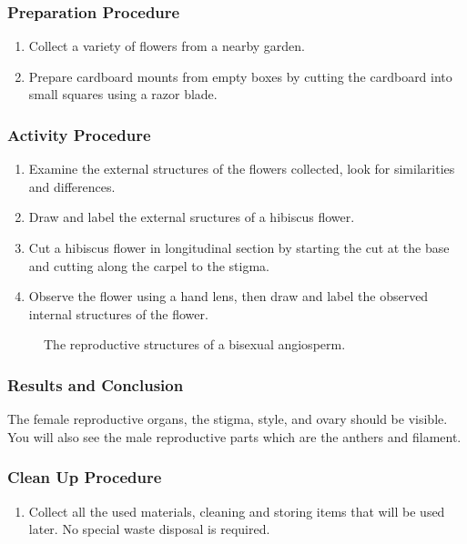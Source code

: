 \subsubsection*{Preparation Procedure}
\begin{enumerate}
\item{Collect a variety of flowers from a nearby garden.}
\item{Prepare cardboard mounts from empty boxes by cutting the cardboard into small squares using a razor blade.}
\end{enumerate}

\subsubsection*{Activity Procedure}
\begin{enumerate}
\item{Examine the external structures of the flowers collected, look for similarities and differences.}
\item{Draw and label the external sructures of a hibiscus flower.}
\item{Cut a hibiscus flower in longitudinal section by starting the cut at the base and cutting along the carpel to the stigma.}
\item{Observe the flower using a hand lens, then draw and label the observed internal structures of the flower.}
\end{enumerate}

\begin{figure}[h]
\begin{center}
\def\svgwidth{9cm}

\caption{The reproductive structures of a bisexual angiosperm.}
\label{fig:hibiscus}
\end{center}
\end{figure}

\subsubsection*{Results and Conclusion}
The female reproductive organs, the stigma, style, and ovary should be visible. You will also see the male reproductive parts which are the anthers and filament.

\subsubsection*{Clean Up Procedure}
\begin{enumerate}
\item{Collect all the used materials, cleaning and storing items that will be used later. No special waste disposal is required.}
\end{enumerate}

